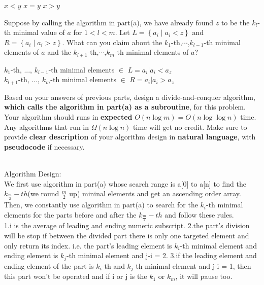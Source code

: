 \begin{parts}
\begin{subparts}
    \begin{oneparcheckboxes}
        \CorrectChoice $x < y$
        \choice $x = y$
        \choice $x > y$
    \end{oneparcheckboxes}

    

    \subpart[2] Suppose by calling the algorithm in part(a), we have already found $z$ to be the $k_l$-th minimal value of $a$ for $1 < l < m$. Let $L = \left\{a_i \mid a_i < z\right\}$ and $R = \left\{a_i \mid a_i > z\right\}$. What can you claim about the $k_1$-th,$\cdots$,$k_{l-1}$-th minimal elements of $a$ and the $k_{l+1}$-th,$\cdots$,$k_{m}$-th minimal elements of $a$?
    
    \begin{solution}
    $k_{1}$-th, ..., $k_{l-1}$-th minimal elements $\in$ $L = {a_{i}| a_{i} < a_{z}}$\\
    $k_{l+1}$-th, ..., $k_{m}$-th minimal elements $\in$ $R = {a_{i}| a_{i} > a_{z}}$\\
    \end{solution}
    
    \subpart[6] Based on your answers of previous parts, design a divide-and-conquer algorithm, \textbf{which calls the algorithm in part(a) as a subroutine}, for this problem. Your algorithm should runs in \textbf{expected} $O(n \log m) = O(n \log \log n)$ time. Any algorithms that run in $\Omega(n \log n)$ time will get no credit. Make sure to provide \textbf{clear description} of your algorithm design in \textbf{natural language}, with \textbf{pseudocode} if necessary.
    
    \begin{solution}
    \\
    Algorithm Design:\\
    We first use algorithm in part(a) whose search range is a[0] to a[n] to find the $k_{\frac{m}{2}}-th$(we round $\frac{m}{2}$ up) mininal elements and get an ascending order array.\\
    Then, we constantly use algorithm in part(a) to search for the $k_{i}$-th minimal elements for the parts before and after the $k_{\frac{m}{2}}-th$ and follow these rules.\\
    1.i is the average of leading and ending numeric subscript.
    2.the part's division will be stop if between the divided part there is only one targeted element and only return its index. i.e. the part's leading element is $k_{i}$-th minimal element and ending element is $k_{j}$-th minimal element and j-i = 2.
    3.if the leading element and ending element of the part is $k_{i}$-th and $k_{j}$-th minimal element and j-i = 1, then this part won't be operated and if i or j is the $k_{1}$ or $k_{m}$, it will pause too.\\
    

\end{solution}
\end{subparts}
\end{parts}

